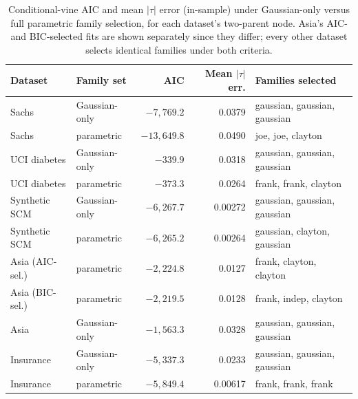 \documentclass[
  english,
  class=report,
  accentcolor=2c,
  marginpar=false,
  parskip=half-,
  fontsize=11pt,
  ruledheaders=false,
  pdfa=false,
  IMRAD=false,
  thesis={type=master}
]{tudapub}
\begin{document}
\begin{table}[ht]
\caption{Conditional-vine AIC and mean $|\tau|$ error (in-sample) under Gaussian-only versus full parametric family selection, for each dataset's two-parent node. Asia's AIC- and BIC-selected fits are shown separately since they differ; every other dataset selects identical families under both criteria.}
\label{tab:sweep}
\centering
\small
\begin{tabular}{llrrl}
\toprule
\textbf{Dataset} & \textbf{Family set} & \textbf{AIC} & \textbf{Mean $|\tau|$ err.} & \textbf{Families selected} \\
\midrule
Sachs         & Gaussian-only & $-7{,}769.2$  & 0.0379 & gaussian, gaussian, gaussian \\
Sachs         & parametric    & $-13{,}649.8$ & 0.0490 & joe, joe, clayton \\
\addlinespace
UCI diabetes  & Gaussian-only & $-339.9$      & 0.0318 & gaussian, gaussian, gaussian \\
UCI diabetes  & parametric    & $-373.3$      & 0.0264 & frank, frank, clayton \\
\addlinespace
Synthetic SCM & Gaussian-only & $-6{,}267.7$  & 0.00272 & gaussian, gaussian, gaussian \\
Synthetic SCM & parametric    & $-6{,}265.2$  & 0.00264 & gaussian, clayton, gaussian \\
\addlinespace
Asia (AIC-sel.)& parametric   & $-2{,}224.8$  & 0.0127 & frank, clayton, clayton \\
Asia (BIC-sel.)& parametric   & $-2{,}219.5$  & 0.0128 & frank, indep, clayton \\
Asia          & Gaussian-only & $-1{,}563.3$  & 0.0328 & gaussian, gaussian, gaussian \\
\addlinespace
Insurance     & Gaussian-only & $-5{,}337.3$  & 0.0233 & gaussian, gaussian, gaussian \\
Insurance     & parametric    & $-5{,}849.4$  & 0.00617 & frank, frank, frank \\
\bottomrule
\end{tabular}
\end{table}
\end{document}
